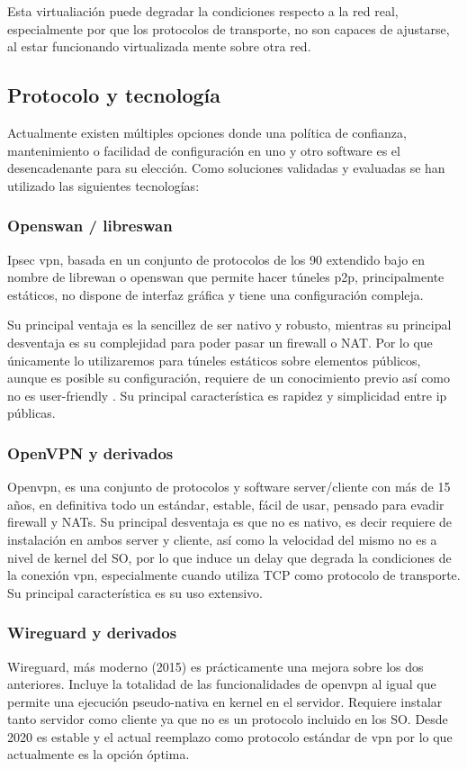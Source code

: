 Esta virtualiación puede degradar la condiciones respecto a la red real, especialmente por que los protocolos de transporte, no son capaces de ajustarse, al estar funcionando virtualizada mente sobre otra red.

\subsection{Protocolo y tecnología}
Actualmente existen múltiples opciones donde una política de confianza, mantenimiento o facilidad de configuración en uno y otro software es el desencadenante para su elección. Como soluciones validadas y evaluadas se han utilizado las siguientes tecnologías:

\subsubsection{Openswan / libreswan}
Ipsec\cite{c_ipsec} vpn, basada en un conjunto de protocolos de los 90 extendido bajo en nombre de librewan o openswan que permite hacer túneles p2p, principalmente estáticos, no dispone de interfaz gráfica y tiene una configuración compleja.

 Su principal ventaja es la sencillez de ser nativo y robusto, mientras su principal desventaja es su complejidad para poder pasar un firewall o NAT. Por lo que únicamente lo utilizaremos para túneles estáticos sobre elementos públicos, aunque es posible su configuración, requiere de un conocimiento previo así como no es user-friendly . Su principal característica es rapidez y simplicidad entre ip públicas.

 \subsubsection{OpenVPN y derivados}
 Openvpn\cite{c_openvpn}, es una conjunto de protocolos y software server/cliente con más de 15 años, en definitiva todo un estándar, estable, fácil de usar, pensado para evadir firewall y NATs. Su principal desventaja es que no es nativo, es decir requiere de instalación en ambos server y cliente, así como la velocidad del mismo no es a nivel de kernel del SO, por lo que induce un delay que degrada la condiciones de la conexión vpn, especialmente cuando utiliza TCP como protocolo de transporte. Su principal característica es su uso extensivo.

\subsubsection{Wireguard y derivados}
 Wireguard\cite{c_wireguard}, más moderno (2015) es prácticamente una mejora sobre los dos anteriores. Incluye la totalidad de las funcionalidades de openvpn al igual que permite una ejecución pseudo-nativa en kernel en el servidor. Requiere instalar tanto servidor como cliente ya que no es un protocolo incluido en los SO. Desde 2020 es estable y el actual reemplazo como protocolo estándar de vpn por lo que actualmente es la opción óptima.

